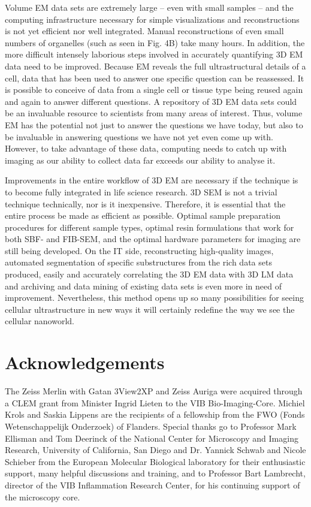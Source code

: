 \documentclass{article}
\begin{document}
Volume EM data sets are extremely large – even with small samples – and the computing infrastructure necessary for simple visualizations and reconstructions is not yet efficient nor well integrated. Manual reconstructions of even small numbers of organelles (such as seen in Fig. 4B) take many hours. In addition, the more difficult intensely laborious steps involved in accurately quantifying 3D EM data need to be improved. Because EM reveals the full ultrastructural details of a cell, data that has been used to answer one specific question can be reassessed. It is possible to conceive of data from a single cell or tissue type being reused again and again to answer different questions. A repository of 3D EM data sets could be an invaluable resource to scientists from many areas of interest. Thus, volume EM has the potential not just to answer the questions we have today, but also to be invaluable in answering questions we have not yet even come up with. However, to take advantage of these data, computing needs to catch up with imaging as our ability to collect data far exceeds our ability to analyse it.

Improvements in the entire workflow of 3D EM are necessary if the technique is to become fully integrated in life science research. 3D SEM is not a trivial technique technically, nor is it inexpensive. Therefore, it is essential that the entire process be made as efficient as possible. Optimal sample preparation procedures for different sample types, optimal resin formulations that work for both SBF- and FIB-SEM, and the optimal hardware parameters for imaging are still being developed. On the IT side, reconstructing high-quality images, automated segmentation of specific substructures from the rich data sets produced, easily and accurately correlating the 3D EM data with 3D LM data and archiving and data mining of existing data sets is even more in need of improvement. Nevertheless, this method opens up so many possibilities for seeing cellular ultrastructure in new ways it will certainly redefine the way we see the cellular nanoworld.

\section*{Acknowledgements}

The Zeiss Merlin with Gatan 3View2XP and Zeiss Auriga were acquired through a CLEM grant from Minister Ingrid Lieten to the VIB Bio-Imaging-Core. Michiel Krols and Saskia Lippens are the recipients of a fellowship from the FWO (Fonds Wetenschappelijk Onderzoek) of Flanders. Special thanks go to Professor Mark Ellisman and Tom Deerinck of the National Center for Microscopy and Imaging Research, University of California, San Diego and Dr. Yannick Schwab and Nicole Schieber from the European Molecular Biological laboratory for their enthusiastic support, many helpful discussions and training, and to Professor Bart Lambrecht, director of the VIB Inflammation Research Center, for his continuing support of the microscopy core.
\end{document}
